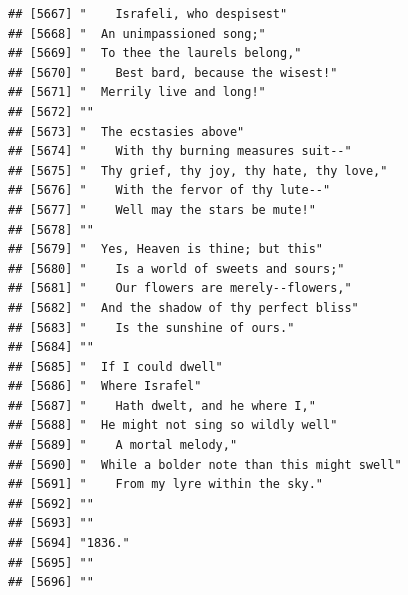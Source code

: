 \documentclass{article}\usepackage[]{graphicx}\usepackage[]{color}
\makeatletter
\newenvironment{kframe}{%
 \def\at@end@of@kframe{}%
 \ifinner\ifhmode%
  \def\at@end@of@kframe{\end{minipage}}%
  \begin{minipage}{\columnwidth}%
 \fi\fi%
 \def\FrameCommand##1{\hskip\@totalleftmargin \hskip-\fboxsep
 \colorbox{shadecolor}{##1}\hskip-\fboxsep
     \hskip-\linewidth \hskip-\@totalleftmargin \hskip\columnwidth}%
 \MakeFramed {\advance\hsize-\width
   \@totalleftmargin\z@ \linewidth\hsize
   \@setminipage}}%
 {\par\unskip\endMakeFramed%
 \at@end@of@kframe}
\newenvironment{knitrout}{}{} %
\makeatother
\begin{document}
\begin{knitrout}
\begin{kframe}
\begin{verbatim}
## [5667] "    Israfeli, who despisest"                                                 
## [5668] "  An unimpassioned song;"                                                    
## [5669] "  To thee the laurels belong,"                                               
## [5670] "    Best bard, because the wisest!"                                          
## [5671] "  Merrily live and long!"                                                    
## [5672] ""                                                                            
## [5673] "  The ecstasies above"                                                       
## [5674] "    With thy burning measures suit--"                                        
## [5675] "  Thy grief, thy joy, thy hate, thy love,"                                   
## [5676] "    With the fervor of thy lute--"                                           
## [5677] "    Well may the stars be mute!"                                             
## [5678] ""                                                                            
## [5679] "  Yes, Heaven is thine; but this"                                            
## [5680] "    Is a world of sweets and sours;"                                         
## [5681] "    Our flowers are merely--flowers,"                                        
## [5682] "  And the shadow of thy perfect bliss"                                       
## [5683] "    Is the sunshine of ours."                                                
## [5684] ""                                                                            
## [5685] "  If I could dwell"                                                          
## [5686] "  Where Israfel"                                                             
## [5687] "    Hath dwelt, and he where I,"                                             
## [5688] "  He might not sing so wildly well"                                          
## [5689] "    A mortal melody,"                                                        
## [5690] "  While a bolder note than this might swell"                                 
## [5691] "    From my lyre within the sky."                                            
## [5692] ""                                                                            
## [5693] ""                                                                            
## [5694] "1836."                                                                       
## [5695] ""                                                                            
## [5696] ""                                                                            

\end{verbatim}
\end{kframe}
\end{knitrout}
\end{document}
